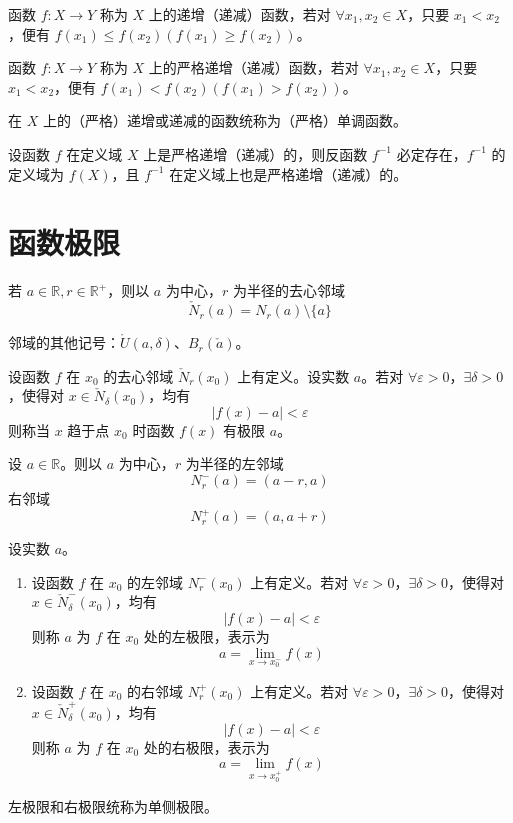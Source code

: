 \begin{definition}
    函数 $f: X \to Y$ 称为 $X$ 上的递增（递减）函数，若对 $\forall x_1, x_2 \in X$，只要 $x_1 < x_2$，便有 $f(x_1) \leqslant f(x_2)(f(x_1) \geqslant f(x_2))$。

    函数 $f: X \to Y$ 称为 $X$ 上的严格递增（递减）函数，若对 $\forall x_1, x_2 \in X$，只要 $x_1 < x_2$，便有 $f(x_1) < f(x_2)(f(x_1) > f(x_2))$。

    在 $X$ 上的（严格）递增或递减的函数统称为（严格）单调函数。
\end{definition}

\begin{theorem}
    设函数 $f$ 在定义域 $X$ 上是严格递增（递减）的，则反函数 $f^{-1}$ 必定存在，$f^{-1}$ 的定义域为 $f(X)$，且 $f^{-1}$ 在定义域上也是严格递增（递减）的。
\end{theorem}



\section{函数极限}

\begin{definition}
    若 $a \in \mathbb{R}, r \in \mathbb{R}^{+}$，则以 $a$ 为中心，$r$ 为半径的去心邻域
    \[\check{N}_{r}(a) = N_{r}(a)\setminus \{ a \}\]
\end{definition}

邻域的其他记号：$\mathring{U}(a, \delta)$、$B_r(\check{a})$。

\begin{definition}
    设函数 $f$ 在 $x_0$ 的去心邻域 $\check{N}_{r}(x_0)$ 上有定义。设实数 $a$。若对 $\forall \varepsilon > 0$，$\exists \delta > 0$，使得对 $x \in \check{N}_{\delta}(x_0)$，均有
    \[|f(x) - a| < \varepsilon\]
    则称当 $x$ 趋于点 $x_0$ 时函数 $f(x)$ 有极限 $a$。
\end{definition}

\begin{definition}
    设 $a \in \mathbb{R}$。则以 $a$ 为中心，$r$ 为半径的左邻域
    \[N_{r}^{-}(a) = (a - r, a)\]
    右邻域
    \[N_{r}^{+}(a) = (a, a + r)\]
\end{definition}

\begin{definition}
    设实数 $a$。
    \begin{enumerate}
        \item 设函数 $f$ 在 $x_0$ 的左邻域 $N_{r}^{-}(x_0)$ 上有定义。若对 $\forall \varepsilon > 0$，$\exists \delta > 0$，使得对 $x \in \check{N}_{\delta}^{-}(x_0)$，均有
              \[|f(x) - a| < \varepsilon\]
              则称 $a$ 为 $f$ 在 $x_0$ 处的左极限，表示为
              \[a = \lim_{x \to x_{0}^{-}}f(x)\]
        \item 设函数 $f$ 在 $x_0$ 的右邻域 $N_{r}^{+}(x_0)$ 上有定义。若对 $\forall \varepsilon > 0$，$\exists \delta > 0$，使得对 $x \in \check{N}_{\delta}^{+}(x_0)$，均有
              \[|f(x) - a| < \varepsilon\]
              则称 $a$ 为 $f$ 在 $x_0$ 处的右极限，表示为
              \[a = \lim_{x \to x_{0}^{+}}f(x)\]
    \end{enumerate}
    左极限和右极限统称为单侧极限。
\end{definition}


